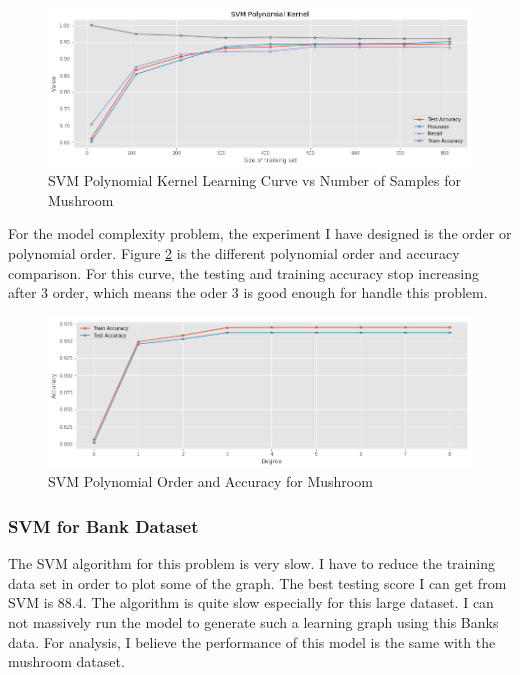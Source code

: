 \documentclass[10pt, conference, compsocconf]{IEEEtran}
\begin{document}
\begin{figure}[h]
	\centering
	\includegraphics[scale = 0.25]{image/mush_svm_learning_pol.png}
	\caption{SVM Polynomial Kernel Learning Curve vs Number of Samples for Mushroom}
	\label{fig:mushroom_svm_learning_pol}
\end{figure}  

For the model complexity problem, the experiment I have designed is the order or polynomial order. Figure \ref{fig:mushroom_svm_pol} is the different polynomial order and accuracy comparison. For this curve, the testing and training accuracy stop increasing after 3 order, which means the oder 3 is good enough for handle this problem. 

\begin{figure}[h]
	\centering
	\includegraphics[scale = 0.25]{image/mush_svm_polynomial.png}
	\caption{SVM Polynomial Order and Accuracy for Mushroom}
	\label{fig:mushroom_svm_pol}
\end{figure} 


\subsubsection{SVM for Bank Dataset}
The SVM algorithm for this problem is very slow. I have to reduce the training data set in order to plot some of the graph. The best testing score I can get from SVM is 88.4. The algorithm is quite slow especially for this large dataset. I can not massively run the model to generate such a learning graph using this Banks data. For analysis, I believe the performance of this model is the same with the mushroom dataset. 
\end{document}
